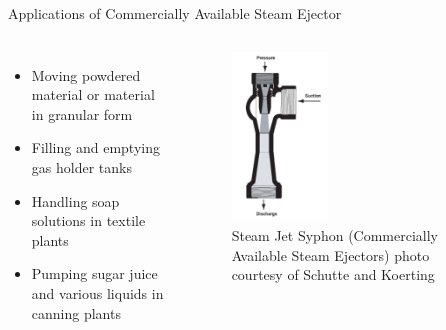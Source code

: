 \begin{frame}{Applications of Commercially Available Steam Ejector\cite{SchutteandKoerting}}
  \begin{columns}
    \begin{itemize}
        \item Moving powdered material or material in granular form
        \item Filling and emptying gas holder tanks
        \item Handling soap solutions in textile plants
        \item Pumping sugar juice and various liquids in canning plants
    \end{itemize}
    \begin{figure}
        \centering
        \includegraphics[height=4.5cm]{images/schutteandkoertingthermosyphon.png}
        \caption{\centering Steam Jet Syphon (Commercially Available Steam Ejectors) photo courtesy of Schutte and Koerting \cite{SchutteandKoerting}}
    \end{figure}
  \end{columns}
\end{frame}

